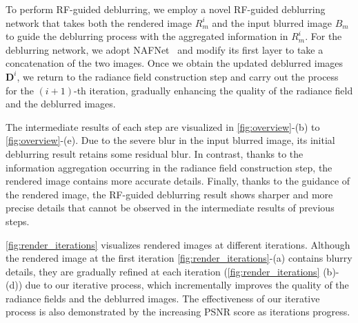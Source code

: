 To perform RF-guided deblurring, we employ a novel RF-guided deblurring network that takes both the rendered image $R_m^i$ and the input blurred image $B_m$ to guide the deblurring process with the aggregated information in $R_m^i$.
For the deblurring network, we adopt NAFNet~\cite{chen2022nafnet} and modify its first layer to take a concatenation of the two images.
Once we obtain the updated deblurred images $\textbf{D}^i$, we return to the radiance field construction step and carry out the process for the $(i+1)$-th iteration, gradually enhancing the quality of the radiance field and the deblurred images.

The intermediate results of each step are visualized in \cref{fig:overview}-(b) to \cref{fig:overview}-(e).
Due to the severe blur in the input blurred image, its initial deblurring result retains some residual blur.
In contrast, thanks to the information aggregation occurring in the radiance field construction step, the rendered image contains more accurate details.
Finally, thanks to the guidance of the rendered image, the RF-guided deblurring result shows sharper and more precise details that cannot be observed in the intermediate results of previous steps.

\cref{fig:render_iterations} visualizes rendered images at different iterations.
Although the rendered image at the first iteration \cref{fig:render_iterations}-(a) contains blurry details, they are gradually refined at each iteration (\cref{fig:render_iterations} (b)-(d)) due to our iterative process, which incrementally improves the quality of the radiance fields and the deblurred images.
The effectiveness of our iterative process is also demonstrated by the increasing PSNR score as iterations progress.


